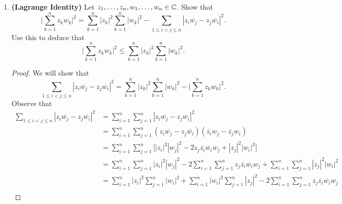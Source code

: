 \documentclass[a4paper]{article}
\begin{document}
\begin{enumerate}
\begin{enumerate}
\begin{proof}
                \end{proof}
        \end{enumerate}
    \item \textbf{(Lagrange Identity)} Let \( {z}_{1}, \dots, {z}_{n}, {w}_{1}, \dots, {w}_{n} \in \mathbb{C}   \). Show that    
        \[  \Big| \sum_{ k=1  }^{ n } {z}_{k} {w}_{k} \Big|^{2} = \sum_{ k=1  }^{ n } | {z}_{k} |^{2} \sum_{ k=1  }^{ n } | {w}_{k } |^{2} - \sum_{ 1 \leq i < j \leq n  }^{  } | {z}_{i} \overline{{w}_{j}} - {z}_{j} \overline{{w}_{i}} |^{2}. \]
        Use this to deduce that 
        \[  \Big| \sum_{ k=1  }^{ n } {z}_{k } {w}_{k } \Big|^{2} \leq \sum_{ k=1  }^{ n } | {z}_{k} |^{2} \sum_{ k=1  }^{ n } | {w}_{k } |^{2}. \]
        \begin{proof}
        We will show that 
        \[  \sum_{ 1 \leq i < j \leq n  }^{  } | {z}_{i} \overline{{w}_{j}} - {z}_{j} \overline{{w}_{i}} |^{2} = \sum_{ k=1  }^{ n } | {z}_{k } |^{2} \sum_{ k=1  }^{ n } | {w}_{k } |^{2} - \Big|  \sum_{ k=1  }^{ n } {z}_{k } {w}_{k } \Big|^{2}. \]
        Observe that 
        \begin{align*}
            \sum_{ 1 \leq i < j \leq n  }^{  } | {z}_{i} \overline{{w}_{j}} - {z}_{j} \overline{{w}_{i}}  |^{2} &= \sum_{ i=1  }^{ n } \sum_{ j=1  }^{ n } | {z}_{i} \overline{{w}_{j}} - {z}_{j} \overline{{w}_{i}} |^{2}  \\
                                                                                                                &= \sum_{ i=1  }^{ n } \sum_{ j=1  }^{ n } ({z}_{i} \overline{{w}_{j}} - {z}_{j} \overline{{w}_{i}})(\overline{{z}_{i}} {w}_{j} - \overline{{z}_{j}} {w}_{i}) \\
                                                                                                                &= \sum_{ i=1  }^{ n } \sum_{ j=1  }^{ n } \Big[ | {z}_{i} |^{2} | {w}_{j} |^{2} - 2 {z}_{j} \overline{{z}_{i}} \overline{{w}_{i}} {w}_{j} + | {z}_{j} |^{2} | {w}_{i} |^{2} \Big] \\
                                                                                                                &= \sum_{ i=1  }^{ n } \sum_{ j=1  }^{ n } | {z}_{i} |^{2} | {w}_{j} |^{2} - 2 \sum_{ i=1  }^{ n }\sum_{ j=1  }^{ n } {z}_{j} \overline{{z}_{i}} \overline{{w}_{i}} {w}_{j}
                                                                                                                + \sum_{ i=1  }^{ n } \sum_{ j=1  }^{ n } | {z}_{j} |^{2} | {w}_{i} |^{2} \\
                                                                                                                &= \sum_{ i=1  }^{ n } | {z}_{i} |^{2} \sum_{ j=1  }^{ n } | {w}_{i} |^{2} + \sum_{ i=1  }^{ n } | {w}_{i} |^{2} \sum_{ j=1  }^{ n } | {z}_{j} |^{2} - 2 \sum_{ i=1  }^{ n } \sum_{ j = 1   }^{ n } {z}_{j} \overline{{z}_{i}} \overline{{w}_{i}} {w}_{j} \\

\end{align*}
\end{proof}
\end{enumerate}
\end{document}
